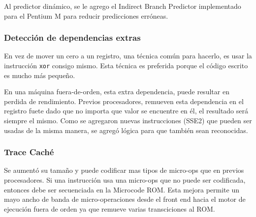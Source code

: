 Al predictor dinámico, se le agrego el Indirect Branch Predictor implementado para el Pentium M para reducir predicciones erróneas.

\subsubsection{Detección de dependencias extras}
En vez de mover un cero a un registro, una técnica común para hacerlo, es usar la instrucción \texttt{xor} consigo mismo. Esta técnica es preferida porque el código escrito es mucho más pequeño.

En una máquina fuera-de-orden, esta extra dependencia, puede resultar en perdida de rendimiento. Previos procesadores, remueven esta dependencia en el registro fuete dado que no importa que valor se encuentre en él, el resultado será siempre el mismo. Como se agregaron nuevas instrucciones (SSE2) que pueden ser usadas de la misma manera, se agregó lógica para que también sean reconocidas.

\subsubsection{Trace Caché}
Se aumentó su tamaño y puede codificar mas tipos de micro-ops que en previos procesadores. Si una instrucción usa una micro-ops que no puede ser codificada, entonces debe ser secuenciada en la Microcode ROM. Esta mejora permite un mayo ancho de banda de micro-operaciones desde el front end hacia el motor de ejecución fuera de orden ya que remueve varias transciciones al ROM.


